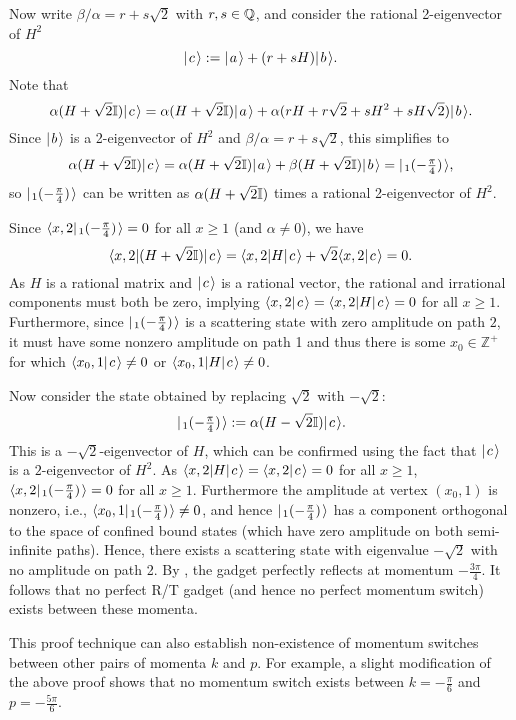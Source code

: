 \documentclass[../thesis-main/thesis-main]{subfiles}
\begin{document}
Now write $\beta/\alpha=r+s\sqrt{2}$ with $r,s\in\mathbb{Q}$, and consider the rational 2-eigenvector of $H^2$
\[
  |\mspace{2mu} c \mspace{2mu} \rangle := |\mspace{2mu} a \mspace{2mu} \rangle + (r+sH) |\mspace{2mu} b \mspace{2mu} \rangle.
\]
Note that
\[
  \alpha (H + \sqrt{2} \mathbb{I}) |\mspace{2mu} c \mspace{2mu} \rangle 
= \alpha(H+ \sqrt{2} \mathbb{I}) |\mspace{2mu} a \mspace{2mu} \rangle + \alpha (rH+r\sqrt{2}+ sH^2+sH\sqrt{2}) |\mspace{2mu} b \mspace{2mu} \rangle.
\]
Since $|\mspace{2mu} b \mspace{2mu} \rangle$ is a 2-eigenvector of $H^2$ and $\beta/\alpha=r+s\sqrt{2}$, this simplifies to
\begin{equation}
  \alpha (H + \sqrt{2}\mathbb{I}) |\mspace{2mu} c \mspace{2mu} \rangle 
  = \alpha (H + \sqrt{2}\mathbb{I}) |\mspace{2mu} a \mspace{2mu} \rangle + \beta(H + \sqrt{2}\mathbb{I}) |\mspace{2mu} b \mspace{2mu} \rangle 
  = |\mspace{2mu} \sc_1(-\tfrac{\pi}{4}) \mspace{2mu} \rangle, \label{eq:sc1_c}
\end{equation}
so $|\mspace{2mu} \sc_1(-\tfrac{\pi}{4}) \mspace{2mu} \rangle$ can be written as $\alpha(H+\sqrt{2}\mathbb{I})$ times a rational 2-eigenvector of $H^2$.

Since $\langle{x,2}|\mspace{2mu} \sc_1(-\tfrac{\pi}{4}) \mspace{2mu} \rangle = 0$ for all $x\geq 1$ (and $\alpha\neq 0$), we have
\[
  \langle{x,2}| (H+\sqrt{2}\mathbb{I}) |\mspace{2mu} c \mspace{2mu} \rangle 
  = \langle{x,2}| H |\mspace{2mu} c \mspace{2mu} \rangle + \sqrt{2} \langle{x,2}|\mspace{2mu} c \mspace{2mu} \rangle 
  = 0.
\]
As $H$ is a rational matrix and $|\mspace{2mu} c \mspace{2mu} \rangle$ is a rational vector, the rational and irrational components must both be zero, implying $\langle{x,2}|\mspace{2mu} c \mspace{2mu} \rangle  =\langle{x,2}|H|\mspace{2mu} c \mspace{2mu} \rangle = 0$ for all $x\geq 1$. Furthermore, since $ |\mspace{2mu} \sc_1(-\tfrac{\pi}{4}) \mspace{2mu} \rangle$ is a scattering state with zero amplitude on path $2$, it must have some nonzero amplitude on path 1 and thus there is some $x_0\in \mathbb{Z}^+$ for which $\langle{x_0,1}|\mspace{2mu} c \mspace{2mu} \rangle\neq 0$ or $\langle{x_0,1}|H|\mspace{2mu} c \mspace{2mu} \rangle \neq 0$.

Now consider the state obtained by replacing $\sqrt{2}$ with $-\sqrt{2}$:
\[
  |\mspace{2mu} \overline{\sc}_1(-\tfrac{\pi}{4}) \mspace{2mu} \rangle := \alpha (H-\sqrt{2}\mathbb{I}) |\mspace{2mu} c \mspace{2mu} \rangle.
\]
This is a $-\sqrt{2}$-eigenvector of $H$, which can be confirmed using the fact that $|\mspace{2mu} c \mspace{2mu} \rangle$ is a $2$-eigenvector of $H^2$. As $\langle{x,2} | H |\mspace{2mu} c \mspace{2mu} \rangle = \langle x,2 |\mspace{2mu} c \mspace{2mu} \rangle = 0$ for all $x\geq 1$, $\langle x,2 |\mspace{2mu} \overline{\sc}_1(-\tfrac{\pi}{4}) \mspace{2mu} \rangle = 0$ for all $x\geq 1$. Furthermore the amplitude at vertex $(x_0,1)$ is nonzero, i.e.,  $\langle x_0,1 |\mspace{2mu} \overline{\sc}_1(-\tfrac{\pi}{4}) \mspace{2mu} \rangle \neq 0$, and hence $|\mspace{2mu} \overline{\sc}_1(-\tfrac{\pi}{4}) \mspace{2mu} \rangle$ has a component orthogonal to the space of confined bound states (which have zero amplitude on both semi-infinite paths).  Hence, there exists a scattering state with eigenvalue $-\sqrt{2}$ with no amplitude on path 2. By , the gadget perfectly reflects at momentum $-\frac{3\pi}{4}$.  It follows that no perfect R/T gadget (and hence no perfect momentum switch) exists between these momenta.

This proof technique can also establish non-existence of momentum switches between other pairs of momenta $k$ and $p$.  For example, a slight modification of the above proof shows that no momentum switch exists between $k = -\frac{\pi}{6}$ and $p = -\frac{5\pi}{6}$. 
\end{document}
